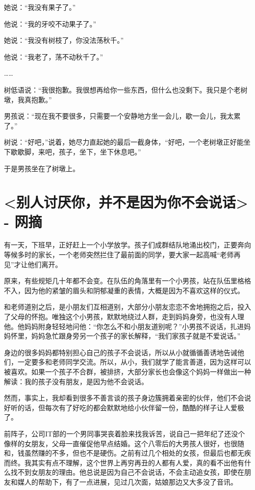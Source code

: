 \documentclass[UTF8,a4paper,8pt]{ctexart}
\begin{document}
 她说：“我没有果子了。” 
 
 他说：“我的牙咬不动果子了。” 
 
 她说：“我没有树枝了，你没法荡秋千。” 
 
 他说：“我老了，荡不动秋千了。” 
 
 …… 
 
 树低语说：“我很抱歉。我很想再给你一些东西，但什么也没剩下。我只是个老树墩，我真抱歉。” 
 
 男孩说：“现在我不要很多，只需要一个安静地方坐一会儿，歇一会儿，我太累了。” 
 
 树说：“好吧，”说着，她尽力直起她的最后一截身体，“好吧，一个老树墩正好能坐下歇歇脚，来吧，孩子，坐下，坐下休息吧。” 
 
 于是男孩坐在了树墩上。
 
 \newpage
 \section{<别人讨厌你，并不是因为你不会说话> - 网摘}
 有一天，下班早，正好赶上一个小学放学。孩子们成群结队地涌出校门，正要奔向等候多时的家长，一个老师突然拦住了最前面的同学，要大家一起高喊“老师再见”才让他们离开。
 
 原来，有些规矩几十年都不会变。在队伍的角落里有一个小男孩，站在队伍里格格不入，因为他的紧皱的眉头和阴郁凝重的表情，大概是因为不喜欢这样的仪式。
 
 和老师道别之后，是小朋友们互相道别，大部分小朋友恋恋不舍地拥抱之后，投入了父母的怀抱。唯独这个小男孩，默默地绕过人群，走到妈妈身旁，也没有人理他。他妈妈附身轻轻地问他：“你怎么不和小朋友道别呢？”小男孩不说话，扎进妈妈怀里，妈妈急忙跟身旁另一个孩子的家长解释，“我们家孩子就是不爱说话。”
 
 身边的很多妈妈都特别担心自己的孩子不会说话，所以从小就循循善诱地告诫他们，一定要多和老师同学交流。所以，从小，我们就学了能言善道，因为这样可以被喜欢。如果一个孩子不合群，被排挤，大部分家长也会像这个妈妈一样做出一种解读：我的孩子没有朋友，是因为他不会说话。
 
 然而，事实上，我却看到很多不善言谈的孩子身边簇拥着亲密的伙伴，他们不会说好听的话，但每次有了好吃的都会默默地给小伙伴留一份，酷酷的样子让人爱极了。﻿
 
 ﻿前阵子，公司IT部的一个男同事哭丧着脸来找我诉苦，说自己一把年纪了还没个像样的女朋友，父母一直催促他早点结婚。这个八零后的大男孩人很好，也很随和，钱虽然赚的不多，但也不是硬伤。之前有过几个相处的女孩，但最后也都无疾而终。我其实有点不理解，这个世界上再穷再丑的人都有人爱，真的看不出他有什么找不到女朋友的理由。他总说是因为自己不会说话，不会主动追女孩，即使在朋友和媒人的帮助下，有了一点进展，见过几次面，姑娘那边又大多没了音讯。
 
\end{document}
